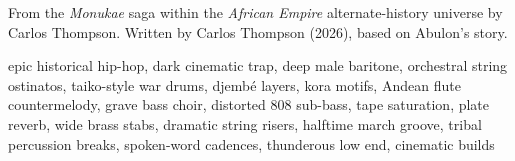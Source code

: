 
\label{sec:thrice-a-prisoner}
\begin{notes}
From the \emph{Monukae} saga within the \emph{African Empire} alternate-history universe by Carlos Thompson. Written by Carlos Thompson (2026), based on Abulon's story.
\end{notes}
\begin{style}
epic historical hip-hop, dark cinematic trap, deep male baritone, orchestral string ostinatos, taiko-style war drums, djembé layers, kora motifs, Andean flute countermelody, grave bass choir, distorted 808 sub-bass, tape saturation, plate reverb, wide brass stabs, dramatic string risers, halftime march groove, tribal percussion breaks, spoken-word cadences, thunderous low end, cinematic builds
\end{style}
